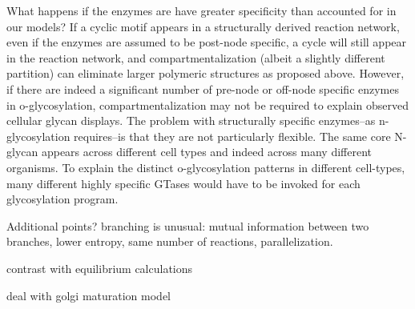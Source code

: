 \documentclass[twocolumn]{article}
\begin{document}
What happens if the enzymes are have greater specificity than accounted for in our models? If a cyclic motif appears in a structurally derived reaction network, even if the enzymes are assumed to be post-node specific, a cycle will still appear in the reaction network, and compartmentalization (albeit a slightly different partition) can eliminate larger polymeric structures as proposed above. However, if there are indeed a significant number of pre-node or off-node specific enzymes in o-glycosylation, compartmentalization may not be required to explain observed cellular glycan displays. The problem with structurally specific enzymes--as n-glycosylation requires--is that they are not particularly flexible. The same core N-glycan appears across different cell types and indeed across many different organisms. To explain the distinct o-glycosylation patterns in different cell-types, many different highly specific GTases would have to be invoked for each glycosylation program. 

Additional points?
branching is unusual: mutual information between two branches, lower entropy, same number of reactions, parallelization. 

contrast with equilibrium calculations

deal with golgi maturation model

 
\end{document}
